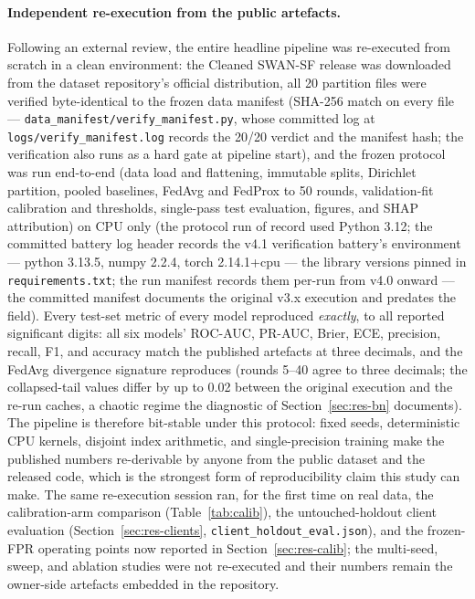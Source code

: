 \paragraph{Independent re-execution from the public artefacts.}
Following an external review, the entire headline pipeline was
re-executed from scratch in a clean environment: the Cleaned SWAN-SF
release was downloaded from the dataset repository's official
distribution, all 20 partition files were verified byte-identical to
the frozen data manifest (SHA-256 match on every file ---
\texttt{data\_manifest/verify\_manifest.py}, whose committed log at
\texttt{logs/verify\_manifest.log} records the 20/20 verdict and the
manifest hash; the verification also runs as a hard gate at pipeline
start), and the frozen
protocol was run end-to-end (data load and flattening, immutable
splits, Dirichlet partition, pooled baselines, FedAvg and FedProx to
50 rounds, validation-fit calibration and thresholds, single-pass test
evaluation, figures, and SHAP attribution) on CPU only (the protocol
run of record used Python 3.12; the committed battery log header
records the v4.1 verification battery's environment --- python
3.13.5, numpy 2.2.4, torch 2.14.1+cpu --- the library versions
pinned in \texttt{requirements.txt}; the run manifest records them
per-run from v4.0 onward --- the committed manifest documents the
original v3.x execution and predates the field). Every test-set metric of every model
reproduced \emph{exactly}, to all reported significant digits: all
six models' ROC-AUC, PR-AUC, Brier, ECE, precision, recall, F1, and
accuracy match the published artefacts at three decimals, and the
FedAvg divergence signature reproduces (rounds 5--40 agree to three
decimals; the collapsed-tail values differ by up to 0.02 between the
original execution and the re-run caches, a chaotic regime the
diagnostic of Section~\ref{sec:res-bn} documents). The pipeline is
therefore bit-stable under this protocol: fixed seeds, deterministic
CPU kernels, disjoint index arithmetic, and single-precision training
make the published numbers re-derivable by anyone from the public
dataset and the released code, which is the strongest form of
reproducibility claim this study can make. The same re-execution
session ran, for the first time on real data, the calibration-arm
comparison (Table~\ref{tab:calib}), the untouched-holdout client
evaluation (Section~\ref{sec:res-clients},
\texttt{client\_holdout\_eval.json}), and the frozen-FPR operating
points now reported in Section~\ref{sec:res-calib}; the multi-seed,
sweep, and ablation studies were not re-executed and their numbers
remain the owner-side artefacts embedded in the repository.

